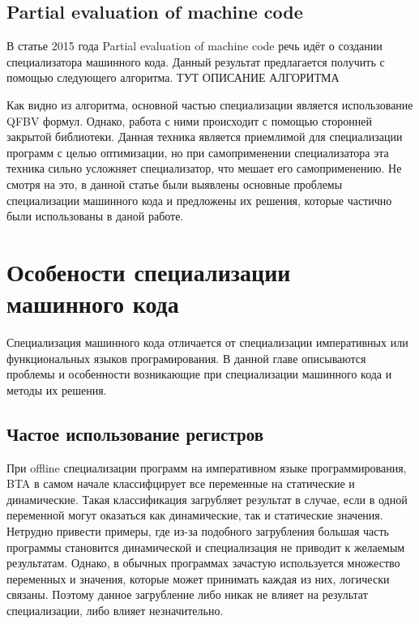 \documentclass{spbau-diploma}
\begin{document}
\subsection{Partial evaluation of machine code}
В статье 2015 года Partial evaluation of machine code речь идёт о создании специализатора машинного кода. Данный результат предлагается получить с помощью следующего алгоритма. {\Large ТУТ ОПИСАНИЕ АЛГОРИТМА}

Как видно из алгоритма, основной частью специализации является использование QFBV формул. Однако, работа с ними происходит с помощью сторонней закрытой библиотеки. Данная техника является приемлимой для специализации программ с целью оптимизации, но при самоприменении специализатора эта техника сильно усложняет специализатор, что мешает его самоприменению. Не смотря на это, в данной статье были выявлены основные проблемы специализации машинного кода и предложены их решения, которые частично были использованы в даной работе. 

\section{Особености специализации машинного кода}

Специализация машинного кода отличается от специализации императивных или функциональных языков програмирования. В данной главе описываются проблемы и особенности возникающие при специализации машинного кода и методы их решения.

\subsection{Частое использование регистров}
При offline специализации программ на императивном языке программирования, BTA в самом начале классифцирует все переменные на статические и динамические. Такая классификация загрубляет результат в случае, если в одной переменной могут оказаться как динамические, так и статические значения. Нетрудно привести примеры, где из-за подобного загрубления большая часть программы становится динамической и специализация не приводит к желаемым результатам. Однако, в обычных программах зачастую используется множество переменных и значения, которые может принимать каждая из них, логически связаны. Поэтому данное загрубление либо никак не влияет на результат специализации, либо влияет незначительно.
\end{document}
